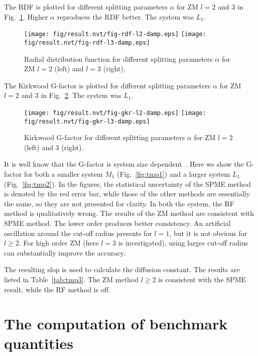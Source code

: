 \documentclass[aip,jcp,a4paper,preprint,unsortedaddress,onecolumn,fleqn]{revtex4-1}
\newcommand{\systemmb}{M_1}
\newcommand{\systemlb}{L_1}
\begin{document}
The RDF is plotted for different splitting parameters $\alpha$ for ZM $l=2$ and 3 in Fig.~\ref{fig:damp-rdf-l23}. Higher $\alpha$ reproduces the RDF better.
The system was $L_1$.
\begin{figure}[]
  \centering
  \texttt{[image: fig/result.nvt/fig-rdf-l2-damp.eps]}
  \texttt{[image: fig/result.nvt/fig-rdf-l3-damp.eps]}
  \caption{Radial distribution function for different splitting parameters $\alpha$ for ZM $l=2$ (left) and $l=3$ (right).}
  \label{fig:damp-rdf-l23}
\end{figure}

The Kirkwood G-factor is plotted for different splitting parameters $\alpha$ for ZM $l=2$ and 3 in Fig.~\ref{fig:damp-gkr-l23}. 
The system was $L_1$.
\begin{figure}[]
  \centering
  \texttt{[image: fig/result.nvt/fig-gkr-l2-damp.eps]}
  \texttt{[image: fig/result.nvt/fig-gkr-l3-damp.eps]}
  \caption{Kirkwood G-factor for different splitting parameters $\alpha$ for ZM $l=2$ (left) and 3 (right).}
  \label{fig:damp-gkr-l23}
\end{figure}


It is well know that the G-factor is system size
dependent~\cite{vanderSpoel2006origin}. Here we show the G-factor for
both a smaller system $\systemmb$ (Fig.~\ref{fig:tmp1}) and a larger system $\systemlb$
(Fig.~\ref{fig:tmp2}).  In the figures, the statistical uncertainty of
the SPME method is denoted by the red error bar, while those of the
other methods are essentially the same, so they are not presented for
clarity.  In both the system, the RF method is qualitatively
wrong. The results of the ZM method are consistent with SPME
method. The lower order produces better consistency.  An artificial
oscillation around the cut-off radius presents for $l=1$, but it is
not obvious for $l\geq 2$.  For high order ZM (here $l=3$ is investigated),
using larger cut-off radius can substantially improve the accuracy.

The
resulting slop is used to calculate the diffusion constant. The results are listed in Table~\ref{tab:tmp3}.
The ZM method $l\geq 2$ is consistent with the SPME
result, while the RF method is off. 

\appendix

\section{The computation of benchmark quantities}
\label{appendix:benchmark}
\end{document}
